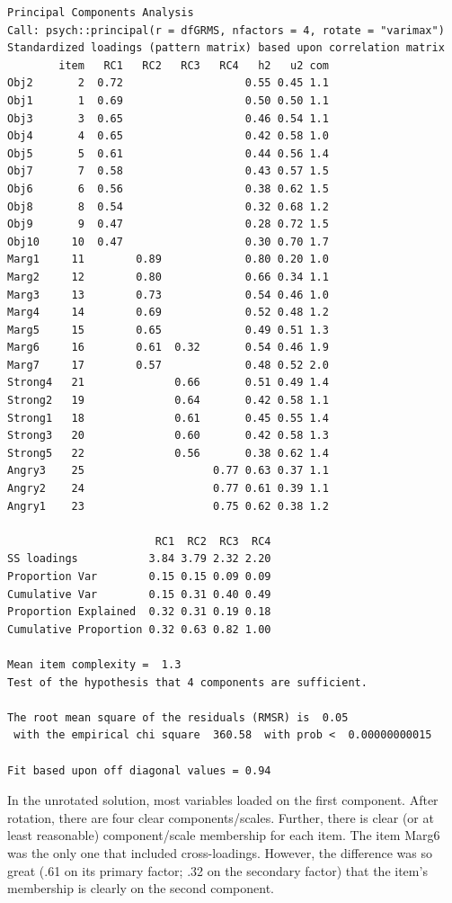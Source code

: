 \documentclass[
  english,
]{book}
\begin{document}
\begin{verbatim}
Principal Components Analysis
Call: psych::principal(r = dfGRMS, nfactors = 4, rotate = "varimax")
Standardized loadings (pattern matrix) based upon correlation matrix
        item   RC1   RC2   RC3   RC4   h2   u2 com
Obj2       2  0.72                   0.55 0.45 1.1
Obj1       1  0.69                   0.50 0.50 1.1
Obj3       3  0.65                   0.46 0.54 1.1
Obj4       4  0.65                   0.42 0.58 1.0
Obj5       5  0.61                   0.44 0.56 1.4
Obj7       7  0.58                   0.43 0.57 1.5
Obj6       6  0.56                   0.38 0.62 1.5
Obj8       8  0.54                   0.32 0.68 1.2
Obj9       9  0.47                   0.28 0.72 1.5
Obj10     10  0.47                   0.30 0.70 1.7
Marg1     11        0.89             0.80 0.20 1.0
Marg2     12        0.80             0.66 0.34 1.1
Marg3     13        0.73             0.54 0.46 1.0
Marg4     14        0.69             0.52 0.48 1.2
Marg5     15        0.65             0.49 0.51 1.3
Marg6     16        0.61  0.32       0.54 0.46 1.9
Marg7     17        0.57             0.48 0.52 2.0
Strong4   21              0.66       0.51 0.49 1.4
Strong2   19              0.64       0.42 0.58 1.1
Strong1   18              0.61       0.45 0.55 1.4
Strong3   20              0.60       0.42 0.58 1.3
Strong5   22              0.56       0.38 0.62 1.4
Angry3    25                    0.77 0.63 0.37 1.1
Angry2    24                    0.77 0.61 0.39 1.1
Angry1    23                    0.75 0.62 0.38 1.2

                       RC1  RC2  RC3  RC4
SS loadings           3.84 3.79 2.32 2.20
Proportion Var        0.15 0.15 0.09 0.09
Cumulative Var        0.15 0.31 0.40 0.49
Proportion Explained  0.32 0.31 0.19 0.18
Cumulative Proportion 0.32 0.63 0.82 1.00

Mean item complexity =  1.3
Test of the hypothesis that 4 components are sufficient.

The root mean square of the residuals (RMSR) is  0.05 
 with the empirical chi square  360.58  with prob <  0.00000000015 

Fit based upon off diagonal values = 0.94
\end{verbatim}

In the unrotated solution, most variables loaded on the first component. After rotation, there are four clear components/scales. Further, there is clear (or at least reasonable) component/scale membership for each item. The item Marg6 was the only one that included cross-loadings. However, the difference was so great (.61 on its primary factor; .32 on the secondary factor) that the item's membership is clearly on the second component.
\end{document}
